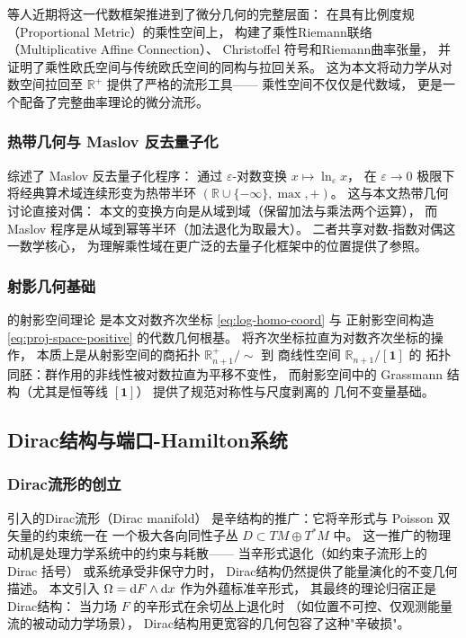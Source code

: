 ﻿\documentclass[10pt,a4paper]{article}
\begin{document}
\textcite{Has2026} 等人近期将这一代数框架推进到了微分几何的完整层面：
在具有比例度规（Proportional Metric）的乘性空间上，
构建了乘性Riemann联络（Multiplicative Affine Connection）、
Christoffel 符号和Riemann曲率张量，
并证明了乘性欧氏空间与传统欧氏空间的同构与拉回关系。
这为本文将动力学从对数空间拉回至 $\mathbb R^+$
提供了严格的流形工具——
乘性空间不仅仅是代数域，
更是一个配备了完整曲率理论的微分流形。

\subsubsection{热带几何与 Maslov 反去量子化}

\textcite{Litvinov2007} 综述了 Maslov 反去量子化程序：
通过 $\varepsilon$-对数变换 $x \mapsto \ln_{\varepsilon} x$，
在 $\varepsilon \to 0$ 极限下将经典算术域连续形变为热带半环
$(\mathbb R \cup \{-\infty\}, \max, +)$。
这与本文热带几何讨论直接对偶：
本文的变换方向是从域到域（保留加法与乘法两个运算），
而 Maslov 程序是从域到幂等半环（加法退化为取最大）。
二者共享对数-指数对偶这一数学核心，
为理解乘性域在更广泛的去量子化框架中的位置提供了参照。

\subsubsection{射影几何基础}

\textcite{Hartshorne1977} 的射影空间理论
是本文对数齐次坐标 \eqref{eq:log-homo-coord} 与
正射影空间构造 \eqref{eq:proj-space-positive} 的代数几何根基。
将齐次坐标拉直为对数齐次坐标的操作，
本质上是从射影空间的商拓扑 $\mathbb R^+_{n+1}/\sim$ 到
商线性空间 $\mathbb R_{n+1}/[\mathbf 1]$ 的
拓扑同胚：群作用的非线性被对数拉直为平移不变性，
而射影空间中的 Grassmann 结构（尤其是恒等线 $[\mathbf 1]$）
提供了规范对称性与尺度剥离的
几何不变量基础。

\subsection{Dirac结构与端口-Hamilton系统}

\subsubsection{Dirac流形的创立}

\textcite{Courant1990} 引入的Dirac流形（Dirac manifold）
是辛结构的推广：它将辛形式与 Poisson 双矢量的约束统一在
一个极大各向同性子丛 $D \subset TM \oplus T^*M$ 中。
这一推广的物理动机是处理力学系统中的约束与耗散——
当辛形式退化（如约束子流形上的 Dirac 括号）
或系统承受非保守力时，
Dirac结构仍然提供了能量演化的不变几何描述。
本文引入 $\Omega = \text dF \wedge \text dx$ 作为外蕴标准辛形式，
其最终的理论归宿正是Dirac结构：
当力场 $F$ 的辛形式在余切丛上退化时
（如位置不可控、仅观测能量流的被动动力学场景），
Dirac结构用更宽容的几何包容了这种"辛破损"。
\end{document}
